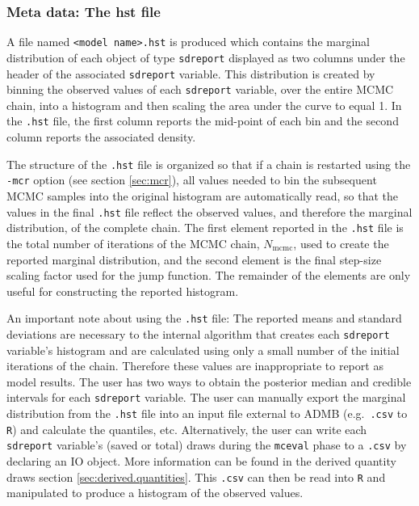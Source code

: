 \documentclass{article}\usepackage[]{graphicx}\usepackage[]{color}
\begin{document}
\subsubsection{Meta data: The hst file}
A file named \texttt{<model name>.hst} is produced which
contains the marginal distribution of each object of type
\texttt{sdreport} displayed as two columns under the header
of the associated \texttt{sdreport} variable.  This
distribution is created by binning the observed values of
each \texttt{sdreport} variable, over the entire MCMC chain,
into a histogram and then scaling the area under the curve
to equal 1. In the \texttt{.hst} file, the first column
reports the mid-point of each bin and the second column
reports the associated density.

The structure of the \texttt{.hst} file is organized so that
if a chain is restarted using the \texttt{-mcr} option (see
section \ref{sec:mcr}), all values needed to bin the
subsequent MCMC samples into the original histogram are
automatically read, so that the values in the final
\texttt{.hst} file reflect the observed values, and
therefore the marginal distribution, of the complete
chain. The first element reported in the \texttt{.hst} file
is the total number of iterations of the MCMC chain,
$N_\text{mcmc}$, used to create the reported marginal
  distribution, and the second element is the final
  step-size scaling factor used for the jump function. The
  remainder of the elements are only useful for constructing
the reported histogram.

An important note about using the \texttt{.hst} file: The
reported means and standard deviations are necessary to the
internal algorithm that creates each \texttt{sdreport}
variable's histogram and are calculated using only a small
number of the initial iterations of the chain. Therefore
these values are inappropriate to report as model results.
The user has two ways to obtain the posterior median and
credible intervals for each \texttt{sdreport} variable.  The
user can manually export the marginal distribution from the
\texttt{.hst} file into an input file external to ADMB
(e.g.\ \texttt{.csv} to \texttt{R}) and calculate the
quantiles, etc. Alternatively, the user can write each
\texttt{sdreport} variable's (saved or total) draws during
the \texttt{mceval} phase to a \texttt{.csv} by declaring an
IO object. More information can be found in the derived
quantity draws section \ref{sec:derived.quantities}. This
\texttt{.csv} can then be read into \texttt{R} and
manipulated to produce a histogram of the observed values.
\end{document}
